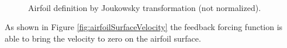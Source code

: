\documentclass[12pt]{aiaa-pretty}
\begin{document}
%
	\begin{figure}[H]
		\centering
		\quad
		\\
		\quad
		\caption{Airfoil definition by Joukowsky transformation (not normalized).}
		\label{fig:flowOverAirfoil}
	\end{figure}
%

As shown in Figure \ref{fig:airfoilSurfaceVelocity} the feedback forcing function is able to bring the velocity to zero on the airfoil surface.
\end{document}

